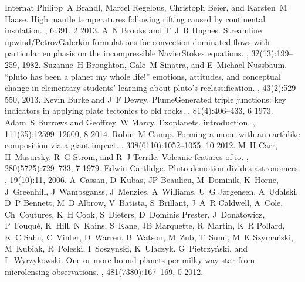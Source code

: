 \documentclass[letterpaper,10pt,english]{jupyterBook}
\begin{document}
\begin{sphinxthebibliography}{Internat}
\sphinxAtStartPar
Philipp A Brandl, Marcel Regelous, Christoph Beier, and Karsten M Haase. High mantle temperatures following rifting caused by continental insulation. , 6:391, 2 2013.
\sphinxAtStartPar
A N Brooks and T J R Hughes. Streamline upwind/Petrov\sphinxhyphen{}Galerkin formulations for convection dominated flows with particular emphasis on the incompressible Navier\sphinxhyphen{}Stokes equations. , 32(1\sphinxhyphen{}3):199–259, 1982.
\sphinxAtStartPar
Suzanne H Broughton, Gale M Sinatra, and E Michael Nussbaum. “pluto has been a planet my whole life!” emotions, attitudes, and conceptual change in elementary students' learning about pluto's reclassification. , 43(2):529–550, 2013.
\sphinxAtStartPar
Kevin Burke and J F Dewey. Plume\sphinxhyphen{}Generated triple junctions: key indicators in applying plate tectonics to old rocks. , 81(4):406–433, 6 1973.
\sphinxAtStartPar
Adam S Burrows and Geoffrey W Marcy. Exoplanets. introduction. , 111(35):12599–12600, 8 2014.
\sphinxAtStartPar
Robin M Canup. Forming a moon with an earth\sphinxhyphen{}like composition via a giant impact. , 338(6110):1052–1055, 10 2012.
\sphinxAtStartPar
M H Carr, H Masursky, R G Strom, and R J Terrile. Volcanic features of io. , 280(5725):729–733, 7 1979.
\sphinxAtStartPar
Edwin Cartlidge. Pluto demotion divides astronomers. , 19(10):11, 2006.
\sphinxAtStartPar
A Cassan, D Kubas, J\sphinxhyphen{}P Beaulieu, M Dominik, K Horne, J Greenhill, J Wambsganss, J Menzies, A Williams, U G Jørgensen, A Udalski, D P Bennett, M D Albrow, V Batista, S Brillant, J A R Caldwell, A Cole, Ch Coutures, K H Cook, S Dieters, D Dominis Prester, J Donatowicz, P Fouqué, K Hill, N Kains, S Kane, J\sphinxhyphen{}B Marquette, R Martin, K R Pollard, K C Sahu, C Vinter, D Warren, B Watson, M Zub, T Sumi, M K Szymański, M Kubiak, R Poleski, I Soszynski, K Ulaczyk, G Pietrzyński, and L Wyrzykowski. One or more bound planets per milky way star from microlensing observations. , 481(7380):167–169, 0 2012.

\end{sphinxthebibliography}
\end{document}
